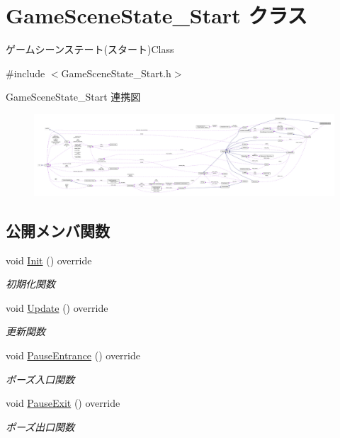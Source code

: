 \hypertarget{class_game_scene_state___start}{}\section{Game\+Scene\+State\+\_\+\+Start クラス}
\label{class_game_scene_state___start}


ゲームシーンステート(スタート)Class  




{\ttfamily \#include $<$Game\+Scene\+State\+\_\+\+Start.\+h$>$}



Game\+Scene\+State\+\_\+\+Start 連携図\nopagebreak
\begin{figure}[H]
\begin{center}
\leavevmode
\includegraphics[width=350pt]{class_game_scene_state___start__coll__graph}
\end{center}
\end{figure}
\subsection*{公開メンバ関数}
\begin{DoxyCompactItemize}
\item 
void \mbox{\hyperlink{class_game_scene_state___start_ae921c57f349fbb2f00a197d40a3404b7}{Init}} () override
\begin{DoxyCompactList}\small\item\em 初期化関数 \end{DoxyCompactList}\item 
void \mbox{\hyperlink{class_game_scene_state___start_ae11bb8d8ea9eae4fea2a9acf33dd1c8b}{Update}} () override
\begin{DoxyCompactList}\small\item\em 更新関数 \end{DoxyCompactList}\item 
void \mbox{\hyperlink{class_game_scene_state___start_a7f1b9f52bfb791622ca589ebd970dade}{Pause\+Entrance}} () override
\begin{DoxyCompactList}\small\item\em ポーズ入口関数 \end{DoxyCompactList}\item 
void \mbox{\hyperlink{class_game_scene_state___start_a667dd2400867b901ca8f2ce3a4f7d367}{Pause\+Exit}} () override
\begin{DoxyCompactList}\small\item\em ポーズ出口関数 \end{DoxyCompactList}\end{DoxyCompactItemize}
